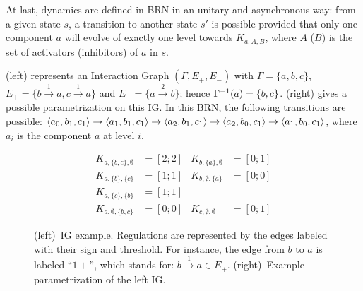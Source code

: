 At last, dynamics are defined in BRN in an unitary and asynchronous way:
from a given state $s$, a transition to another state $s'$ is possible provided that only one component $a$ will evolve of exactly one level towards $K_{a,A,B}$, where $A$ (\resp $B$) is the set of activators (\resp inhibitors) of $a$ in $s$.

\begin{example*}
(left) represents an Interaction Graph $(\Gamma,E_+,E_-)$ with
$\Gamma = \{a, b, c\}$,
$E_+ = \{b \xrightarrow{1} a, c \xrightarrow{1} a\}$ and
$E_- = \{a \xrightarrow{2} b\}$;
hence $\Gamma^{-1}(a) = \{b, c\}$.
(right) gives a possible parametrization on this IG.
In this BRN, the following transitions are possible:
$\mbox{$\langle a_0, b_1, c_1 \rangle$} \rightarrow \mbox{$\langle a_1, b_1, c_1 \rangle$} \rightarrow \mbox{$\langle a_2, b_1, c_1 \rangle$} \rightarrow
\mbox{$\langle a_2, b_0, c_1 \rangle$} \rightarrow \mbox{$\langle a_1, b_0, c_1 \rangle$}$,
where $a_i$ is the component $a$ at level $i$.
\end{example*}

\begin{figure}[t]
\begin{minipage}{0.4\linewidth}
\centering
{}
\end{minipage}
\begin{minipage}{0.6\linewidth}
\centering
\begin{align*}
K_{a,\{b,c\},\emptyset} &= [2 ; 2] & K_{b,\{a\},\emptyset} &= [0 ; 1] \\
K_{a,\{b\},\{c\}} &= [1 ; 1] & K_{b,\emptyset,\{a\}} &= [0 ; 0] \\
K_{a,\{c\},\{b\}} &= [1 ; 1] &&\\
K_{a,\emptyset,\{b,c\}} &= [0 ; 0] & K_{c,\emptyset,\emptyset} &= [0 ; 1]
\end{align*}
\end{minipage}
\caption{\label{fig:runningBRN}
(left)~IG example.
Regulations are represented by the edges labeled with their sign and threshold.
For instance, the edge from $b$ to $a$ is labeled “$1+$”, which stands for: $b \xrightarrow{1} a \in
E_+$.
(right)~Example parametrization of the left IG.
}
\end{figure}
